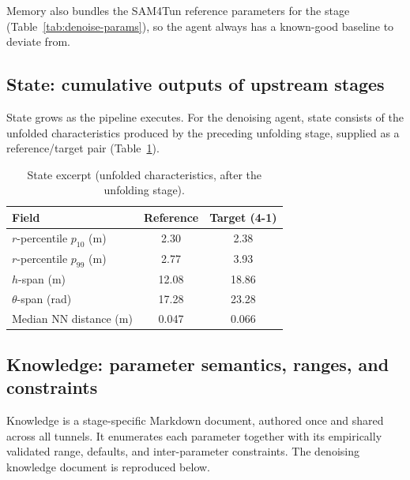 Memory also bundles the SAM4Tun reference parameters for the stage (Table~\ref{tab:denoise-params}), so the agent always has a known-good baseline to deviate from.

\subsection{State: cumulative outputs of upstream stages}\label{app:context-state}
State grows as the pipeline executes. For the denoising agent, state consists of the unfolded characteristics produced by the preceding unfolding stage, supplied as a reference/target pair (Table~\ref{tab:context-state}).

\begin{table}[ht]
\caption{State excerpt (unfolded characteristics, after the unfolding stage).}\label{tab:context-state}
\begin{tabular*}{\tblwidth}{@{} l c c @{}}
\toprule
Field & Reference & Target (4-1) \\
\midrule
$r$-percentile $p_{10}$ (m) & 2.30 & 2.38 \\
$r$-percentile $p_{99}$ (m) & 2.77 & 3.93 \\
$h$-span (m) & 12.08 & 18.86 \\
$\theta$-span (rad) & 17.28 & 23.28 \\
Median NN distance (m) & 0.047 & 0.066 \\
\bottomrule
\end{tabular*}
\end{table}

\subsection{Knowledge: parameter semantics, ranges, and constraints}\label{app:context-knowledge}
Knowledge is a stage-specific Markdown document, authored once and shared across all tunnels. It enumerates each parameter together with its empirically validated range, defaults, and inter-parameter constraints. The denoising knowledge document is reproduced below.


